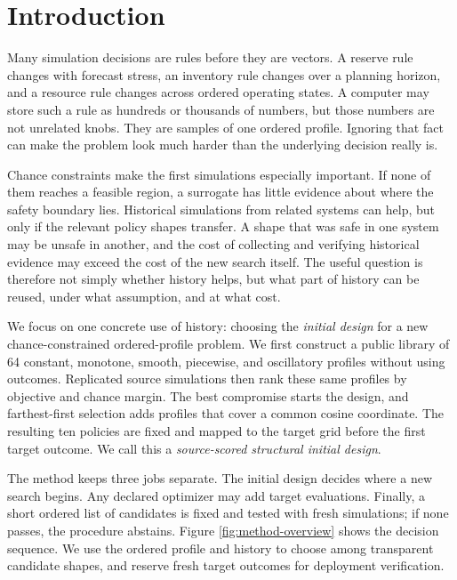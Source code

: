 \section{Introduction}\label{sec:introduction}

Many simulation decisions are rules before they are vectors.  A reserve rule
changes with forecast stress, an inventory rule changes over a planning
horizon, and a resource rule changes across ordered operating states.  A
computer may store such a rule as hundreds or thousands of numbers, but those
numbers are not unrelated knobs.  They are samples of one ordered profile.
Ignoring that fact can make the problem look much harder than the underlying
decision really is.

Chance constraints make the first simulations especially important.  If none
of them reaches a feasible region, a surrogate has little evidence about
where the safety boundary lies.  Historical simulations from related systems
can help, but only if the relevant policy shapes transfer.  A shape that was
safe in one system may be unsafe in another, and the cost of collecting and
verifying historical evidence may exceed the cost of the new search itself.
The useful question is therefore not simply whether history helps, but what
part of history can be reused, under what assumption, and at what cost.

We focus on one concrete use of history: choosing the \emph{initial design}
for a new chance-constrained ordered-profile problem.  We first construct a
public library of 64 constant, monotone, smooth, piecewise, and oscillatory
profiles without using outcomes.  Replicated source simulations then rank
these same profiles by objective and chance margin.  The best compromise
starts the design, and farthest-first selection adds profiles that cover a
common cosine coordinate.  The resulting ten policies are fixed and mapped to
the target grid before the first target outcome.  We call this a
\emph{source-scored structural initial design}.

The method keeps three jobs separate.  The initial design decides where a new
search begins.  Any declared optimizer may add target evaluations.  Finally,
a short ordered list of candidates is fixed and tested with fresh simulations;
if none passes, the procedure abstains.  Figure \ref{fig:method-overview}
shows the decision sequence.  We use the ordered profile and history to
choose among transparent candidate shapes,
and reserve fresh target outcomes for deployment verification.

